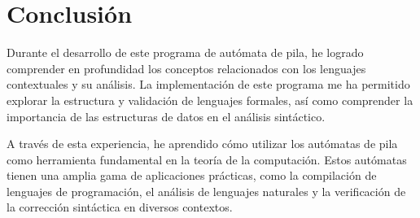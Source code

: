 \chapter{Conclusión}

Durante el desarrollo de este programa de autómata de pila, he logrado comprender en profundidad los conceptos relacionados con los lenguajes contextuales y su análisis. La implementación de este programa me ha permitido explorar la estructura y validación de lenguajes formales, así como comprender la importancia de las estructuras de datos en el análisis sintáctico.\newline

A través de esta experiencia, he aprendido cómo utilizar los autómatas de pila como herramienta fundamental en la teoría de la computación. Estos autómatas tienen una amplia gama de aplicaciones prácticas, como la compilación de lenguajes de programación, el análisis de lenguajes naturales y la verificación de la corrección sintáctica en diversos contextos.\newline
\\

